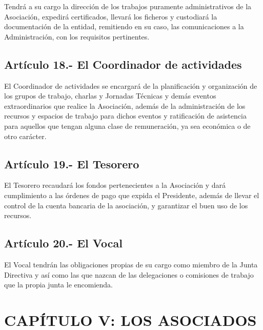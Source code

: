 \documentclass[10pt, spanish, pdftex]{gulplantilla}
\begin{document}
Tendrá a su cargo la dirección de los trabajos puramente administrativos de la Asociación, expedirá certificados, llevará los ficheros y custodiará la documentación de la entidad, remitiendo en su caso, las comunicaciones a la Administración, con los requisitos pertinentes.


\subsection{Artículo 18.- El Coordinador de actividades}
El Coordinador de actividades se encargará de la planificación y organización de los grupos de trabajo, charlas y Jornadas Técnicas y demás eventos extraordinarios que realice la Asociación, además de la administración de los recursos y espacios de trabajo para dichos eventos y ratificación de asistencia para aquellos que tengan alguna clase de remuneración, ya sea económica o de otro carácter.

\subsection{Artículo 19.- El Tesorero}
El Tesorero recaudará los fondos pertenecientes a la Asociación y dará cumplimiento a las órdenes de pago que expida el Presidente, además de llevar el control de la cuenta bancaria de la asociación, y garantizar el buen uso de los recursos.

\subsection{Artículo 20.- El Vocal}
El Vocal tendrán las obligaciones propias de su cargo como miembro de la Junta Directiva y así como las que nazcan de las delegaciones o comisiones de trabajo que la propia junta le encomienda.


\newpage {}
\section{CAPÍTULO V: LOS ASOCIADOS}
\end{document}
